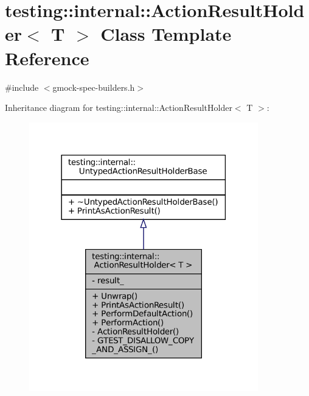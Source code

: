 \hypertarget{classtesting_1_1internal_1_1ActionResultHolder}{}\section{testing\+:\+:internal\+:\+:Action\+Result\+Holder$<$ T $>$ Class Template Reference}
\label{classtesting_1_1internal_1_1ActionResultHolder}


{\ttfamily \#include $<$gmock-\/spec-\/builders.\+h$>$}



Inheritance diagram for testing\+:\+:internal\+:\+:Action\+Result\+Holder$<$ T $>$\+:
\nopagebreak
\begin{figure}[H]
\begin{center}
\leavevmode
\includegraphics[width=282pt]{classtesting_1_1internal_1_1ActionResultHolder__inherit__graph}
\end{center}
\end{figure}


